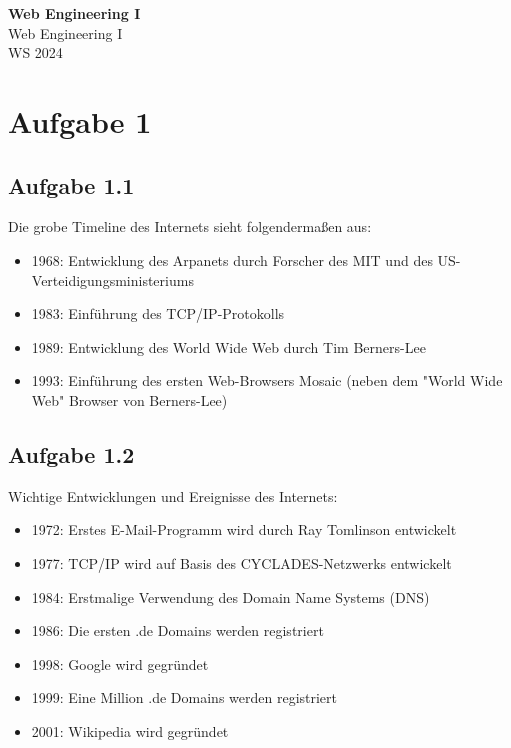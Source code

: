 \documentclass[11pt]{article}
\begin{document}
\thispagestyle{empty}

\newtheorem{definition}{Definition}[section]
\newtheorem{anmk}{Anmerkung}[section]
\newtheorem{bsp}{Beispiel}[section]

\newcommand{\N}{\mathbb{N}}
\newcommand{\Z}{\mathbb{Z}}
\newcommand{\R}{\mathbb{R}}

\begin{center}
  {\LARGE \bf Web Engineering I}\\
  {\Large Web Engineering I}\\
  WS 2024
\end{center}

\section{Aufgabe 1}
\subsection{Aufgabe 1.1}
Die grobe Timeline des Internets sieht folgendermaßen aus:
\begin{itemize}
  \item 1968: Entwicklung des Arpanets durch Forscher des MIT und des US-Verteidigungsministeriums
  \item 1983: Einführung des TCP/IP-Protokolls
  \item 1989: Entwicklung des World Wide Web durch Tim Berners-Lee
  \item 1993: Einführung des ersten Web-Browsers Mosaic (neben dem "World Wide Web" Browser von Berners-Lee)
\end{itemize}

\subsection{Aufgabe 1.2}
Wichtige Entwicklungen und Ereignisse des Internets:
\begin{itemize}
  \item 1972: Erstes E-Mail-Programm wird durch Ray Tomlinson entwickelt
  \item 1977: TCP/IP wird auf Basis des CYCLADES-Netzwerks entwickelt
  \item 1984: Erstmalige Verwendung des Domain Name Systems (DNS)
  \item 1986: Die ersten .de Domains werden registriert
  \item 1998: Google wird gegründet
  \item 1999: Eine Million .de Domains werden registriert
  \item 2001: Wikipedia wird gegründet
\end{itemize}
\end{document}
